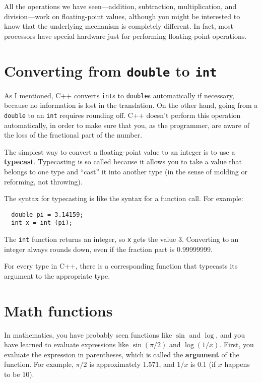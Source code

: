 
All the operations we have seen---addition, subtraction,
multiplication, and division---work on floating-point values,
although you might be interested to know that the underlying mechanism
is completely different.  In fact, most processors have special
hardware just for performing floating-point operations.

\section{Converting from {\tt double} to {\tt int}}
\label{rounding}

As I mentioned, C++ converts {\tt int}s
to {\tt double}s automatically if necessary, because no
information is lost in the translation.  On the other hand,
going from a {\tt double} to an {\tt int} requires rounding
off.  C++ doesn't perform this operation automatically, in
order to make sure that you, as the programmer, are aware
of the loss of the fractional part of the number.

The simplest way to convert a floating-point value to an integer is to
use a {\bf typecast}.  Typecasting is so called because it allows you
to take a value that belongs to one type and ``cast'' it into another
type (in the sense of molding or reforming, not throwing).

The syntax for typecasting is like the syntax
for a function call.  For example:

\begin{verbatim}
  double pi = 3.14159;
  int x = int (pi);
\end{verbatim}
%
The {\tt int} function returns an integer, so {\tt x} gets the value
3.  Converting to an integer always rounds down, even if the fraction
part is 0.99999999.

For every type in C++, there is a corresponding function that
typecasts its argument to the appropriate type.

\section{Math functions}

In mathematics, you have probably seen functions like $\sin$ and
$\log$, and you have learned to evaluate expressions like
$\sin(\pi/2)$ and $\log(1/x)$.  First, you evaluate the
expression in parentheses, which is called the {\bf argument} of the
function.  For example, $\pi/2$ is approximately 1.571, and $1/x$ is
0.1 (if $x$ happens to be 10).

